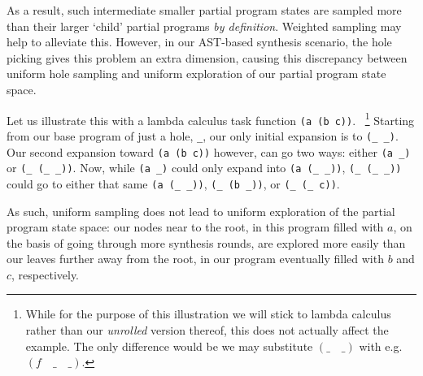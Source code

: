 \documentclass{article}
\begin{document}
As a result, such intermediate smaller partial program states are sampled more than their larger `child' partial programs \emph{by definition}.
Weighted sampling may help to alleviate this.
However, in our AST-based synthesis scenario,
the hole picking gives this problem an extra dimension,
causing this discrepancy between uniform hole sampling and uniform exploration of our partial program state space.

Let us illustrate this with a lambda calculus task function \verb|(a (b c))|.%
~\footnote{
    While for the purpose of this illustration we will stick to lambda calculus
    rather than our \emph{unrolled} version thereof,
    this does not actually affect the example.
    The only difference would be we may substitute $(\_\quad\_)$ with e.g. $(f\quad\_\quad\_)$.
}
Starting from our base program of just a hole, \verb|_|,
our only initial expansion is to \verb|(_ _)|.
Our second expansion toward \verb|(a (b c))| however,
can go two ways: either \verb|(a _)| or \verb|(_ (_ _))|.
Now, while \verb|(a _)| could only expand into \verb|(a (_ _))|,
\verb|(_ (_ _))| could go to either that same \verb|(a (_ _))|,
\verb|(_ (b _))|, or \verb|(_ (_ c))|.

As such, uniform sampling does not lead to uniform exploration of the partial program state space:
our nodes near to the root, in this program filled with $a$,
on the basis of going through more synthesis rounds,
are explored more easily than our leaves further away from the root,
in our program eventually filled with $b$ and $c$, respectively.
\end{document}
